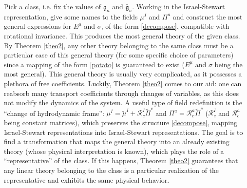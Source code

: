 \documentclass[aps,prl,singlecolumn,nofootinbib]{revtex4-2}
\theoremstyle{definition}
\theoremstyle{theorem}
\begin{document}
%
Pick a class, i.e. fix the values of $\mathfrak{g}_n$ and $\bar{\mathfrak{g}}_n$. Working in the Israel-Stewart representation, give some names to the fields $\mu^I$ and $\Pi^a$ and construct the most general expressions for $E^\mu$ and $\sigma$, of the form \eqref{decompose}, compatible with rotational invariance. This produces the most general theory of the given class. By Theorem \ref{theo2}, any other theory belonging to the same class must be a particular case of this general theory (for some specific choice of parameters) since a mapping of the form \eqref{potato} is guaranteed to exist ($E^\mu$ and $\sigma$ being the most general). 
This general theory is usually very complicated, as it possesses a plethora of free coefficients. Luckily, Theorem \ref{theo2} comes to our aid: one can reabsorb many transport coefficients through changes of variables, as this does not modify the dynamics of the system. A useful type of field redefinition is the ``change of hydrodynamic frame'': $\mu^I = \tilde{\mu}^I +\mathcal{R}^I_c \tilde{\Pi}^c$ and $\Pi^a = \mathcal{R}^a_c \tilde{\Pi}^c$ ($\mathcal{R}^I_c$ and $\mathcal{R}^a_c$ being constant matrices), which preserves the structure \eqref{decompose},  mapping Israel-Stewart representations into  Israel-Stewart representations. The goal is to find a transformation that maps the general theory into an already existing theory (whose physical interpretation is known), which plays the role of a ``representative'' of the class. If this happens, Theorem \ref{theo2} guarantees that any linear theory belonging to the class is a particular realization of the representative and exhibits the same physical behavior.
\end{document}
